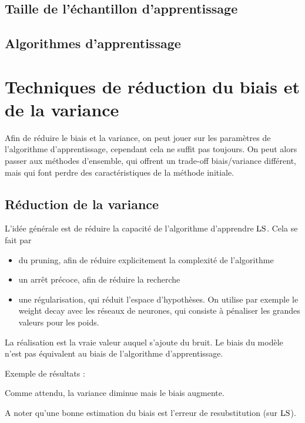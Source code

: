 		
		\subsection{Taille de l'échantillon d'apprentissage}
		
		
		\subsection{Algorithmes d'apprentissage}
		
		
	\section{Techniques de réduction du biais et de la variance}
	
	Afin de réduire le biais et la variance, on peut jouer sur les paramètres de l'algorithme d'apprentissage, cependant cela ne suffit pas toujours. On peut alors passer aux méthodes d'ensemble, qui offrent un trade-off biais/variance différent, mais qui font perdre des caractéristiques de la méthode initiale.
	
		\subsection{Réduction de la variance}
		
		L'idée générale est de réduire la capacité de l'algorithme d'apprendre $\text{LS}$. Cela se fait par
		
		\begin{itemize}
			\item du pruning, afin de réduire explicitement la complexité de l'algorithme
			\item un arrêt précoce, afin de réduire la recherche
			\item une régularisation, qui réduit l'espace d'hypothèses. On utilise par exemple le weight decay avec les réseaux de neurones, qui consiste à pénaliser les grandes valeurs pour les poids.
		\end{itemize}
		
		
		La réalisation est la vraie valeur auquel s'ajoute du bruit. Le biais du modèle n'est pas équivalent au biais de l'algorithme d'apprentissage.
				
		Exemple de résultats :
		
		
		Comme attendu, la variance diminue mais le biais augmente.
		
		A noter qu'une bonne estimation du biais est l'erreur de resubstitution (sur $\text{LS}$).